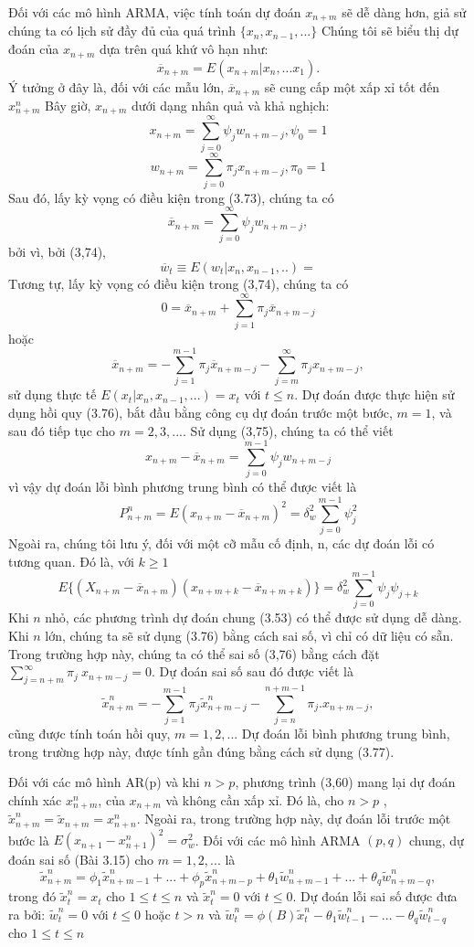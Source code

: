 \documentclass[12pt, a4paper,oneside]{book}
\theoremstyle{definition}
\begin{document}
Đối với các mô hình ARMA, việc tính toán dự đoán $x_{n+m}$ sẽ dễ dàng hơn, giả sử chúng ta có lịch sử đầy đủ của quá trình $\{x_{n},x_{n-1},...\}$ Chúng tôi sẽ biểu thị dự đoán của $x_{n+m}$ dựa trên quá khứ vô hạn như: 
$$\overline{x}_{n+m} = E(x_{n+m}|x_{n},...x_{1}).$$
Ý tưởng ở đây là, đối với các mẫu lớn, $\overline{x}_{n+m}$ sẽ cung cấp một xấp xỉ tốt đến $x_{n+m}^{n}$  
Bây giờ, $x_{n+m}$ dưới dạng nhân quả và khả nghịch:
$$x_{n+m}= \sum_{j=0}^{\infty} \psi_{j}w_{n+m-j}, \psi_{0}=1$$
$$w_{n+m}= \sum_{j=0}^{\infty} \pi_{j}x_{n+m-j}, \pi_{0}=1$$
Sau đó, lấy kỳ vọng có điều kiện trong (3.73), chúng ta có
$$ \overline{x}_{n+m} =\sum_{j=0}^{\infty}\psi_{j}w_{n+m-j},$$
bởi vì, bởi (3,74),
$$\overline{w}_{t}\equiv E(w_{t}|x_{n},x_{n-1},..) = $$
Tương tự, lấy kỳ vọng có điều kiện trong (3,74), chúng ta có
$$0 = \overline{x}_{n+m} + \sum_{j=1}^{\infty} \pi_{j}\overline{x}_{n+m-j}$$
hoặc
$$\overline{x}_{n+m} = -\sum_{j=1}^{m-1}\pi_{j}\overline{x}_{n+m-j}- \sum_{j=m}^{\infty}\pi_{j}x_{n+m-j},$$
sử dụng thực tế $E(x_{t}|x_{n},x_{n-1},...)= x_{t}$ với $t \leq n$. Dự đoán được thực hiện sử dụng hồi quy (3.76), bắt đầu bằng công cụ dự đoán trước một bước, $m = 1$, và sau đó tiếp tục cho $m = 2, 3 ,. . ..$ Sử dụng (3,75), chúng ta có thể viết
$$x_{n+m} - \overline{x}_{n+m} = \sum_{j=0}^{m-1}\psi_{j}w_{n+m-j}$$
vì vậy dự đoán  lỗi bình phương trung bình có thể được viết là
$$P_{n+m}^{n}= E(x_{n+m} - \overline{x}_{n+m})^{2}= \delta^{2}_{w} \sum_{j=0}^{m-1}\psi_{j}^{2}$$
Ngoài ra, chúng tôi lưu ý, đối với một cỡ mẫu cố định, n, các dự đoán  lỗi có tương quan.
Đó là, với $ k\geq 1$
$$E\{(X_{n+m}- \overline{x}_{n+m})(x_{n+m+k} - \overline{x}_{n+m+k})\}= \delta_{w}^{2}\sum_{j=0}^{m-1}\psi_{j}\psi_{j+k}$$
Khi $n$ nhỏ, các phương trình dự đoán chung (3.53) có thể được sử dụng dễ dàng. Khi $n$ lớn, chúng ta sẽ sử dụng (3.76) bằng cách sai số, vì chỉ có dữ liệu có sẵn. Trong trường hợp này, chúng ta có thể sai số (3,76) bằng cách đặt $\sum_{j=n+m}^{\infty} \pi_{j}\ x_{n+m-j}= 0$. Dự đoán sai số sau đó được viết là
$$\tilde{x}^{n}_{n+m}= - \sum_{j=1}^{m-1}\pi_{j}\tilde{x}_{n+m-j}^{n} - \sum_{j=n}^{n+m-1}\pi_{j}.x_{n+m-j} ,$$
cũng được tính toán hồi quy, $m = 1, 2 ,...$ Dự đoán lỗi bình phương trung bình, trong trường hợp này, được tính gần đúng bằng cách sử dụng (3.77).

Đối với các mô hình AR(p) và khi $n> p$, phương trình (3,60) mang lại dự đoán chính xác $x^{n}_{n+m}$, của $x_{n+m}$ và không cần xấp xỉ. Đó là, cho $n> p$ , $\tilde{x}_{n+m}^{n}=\tilde{x}_{n+m}=x^{n}_{n+n}$. Ngoài ra, trong trường hợp này, dự đoán lỗi trước một bước là  $E(x_{n+1} - x_{n+1}^{n})^{2}=\sigma^{2}_{w}$. Đối với các mô hình ARMA $(p, q)$ chung, dự đoán sai số (Bài 3.15) cho $m = 1, 2 ,...$ là
$$\tilde{x}^{n}_{n+m}=\phi_{1}\tilde{x}^{n}_{n+m-1}+...+ \phi_{p}\tilde{x}^{n}_{n+m-p}+ \theta_{1}\tilde{w}^{n}_{n+m-1}+...+\theta_{q}\tilde{w}^{n}_{n+m-q},$$
trong đó $\tilde{x}_{t}^{n}=x_{t}$ cho $1\leqslant t \leqslant n$ và $\tilde{x}^{n}_{t}=0$ với $t\leqslant0$. Dự đoán lỗi sai số được đưa ra bởi: $\tilde{w}_{t}^{n}=0$ với $t\leqslant0$ hoặc $t>n$ và $\tilde{w}_{t}^{n}=\phi(B)\tilde{x}_{t}^{n}-\theta_{1} \tilde{w}_{t-1}^{n}-...-\theta_{q}\tilde{w}_{t-q}^{n}$ cho $ 1 \leq t \leq n $ 
\end{document}
